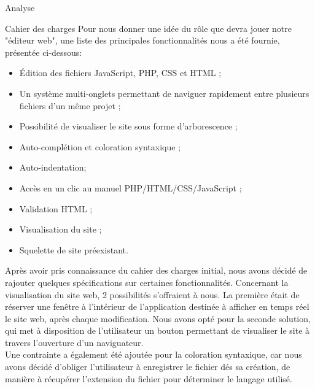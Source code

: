 \documentclass[a4paper, 12pt]{report}
\begin{document}
	\begin{part}{Analyse}
		\begin{chapter}{Cahier des charges}
		Pour nous donner une idée du rôle que devra jouer notre "éditeur web", une liste des principales fonctionnalités nous a été fournie, présentée ci-dessous:\\
						\begin{itemize}
					\item Édition des fichiers JavaScript, PHP, CSS et HTML ;
					\item Un système multi-onglets permettant de naviguer rapidement entre plusieurs fichiers d'un même projet ;
					\item Possibilité de visualiser le site sous forme d'arborescence ;
					\item Auto-complétion et coloration syntaxique ;
					\item Auto-indentation;
					\item Accès en un clic au manuel PHP/HTML/CSS/JavaScript ;
					\item Validation HTML ;
					\item Visualisation du site ;
					\item Squelette de site préexistant.
				\end{itemize}
				
		Après avoir pris connaissance du cahier des charges initial, nous avons décidé de rajouter quelques spécifications sur certaines fonctionnalités. Concernant la visualisation du site web, 2 possibilités s'offraient à nous. La première était de réserver une fenêtre à l'intérieur de l'application destinée à afficher en temps réel le site web, après chaque modification. Nous avons opté pour la seconde solution, qui met à disposition de l'utilisateur un bouton permettant de visualiser le site à travers l'ouverture d'un naviguateur.\\
		Une contrainte a également été ajoutée pour la coloration syntaxique, car nous avons décidé d'obliger l'utilisateur à enregistrer le fichier dés sa création, de manière à récupérer l'extension du fichier pour déterminer le langage utilisé.\\
		

\end{chapter}
\end{part}
\end{document}
